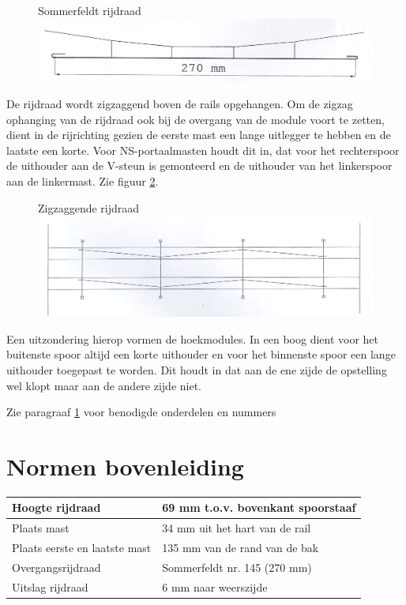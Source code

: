 \documentclass[12pt,a4paper]{report}
\begin{document}
\begin{figure}[ht]
  \captionbox
  {Sommerfeldt rijdraad\label{figuur9}}
  {\includegraphics[scale=1.0]{images/rcu_figuur9}}
\end{figure}

De rijdraad wordt zigzaggend boven de rails opgehangen. Om de zigzag ophanging van de rijdraad ook bij de overgang van de module voort te zetten, dient in de rijrichting gezien de eerste mast een lange uitlegger te hebben en de laatste een korte. Voor NS-portaalmasten houdt dit in, dat voor het rechterspoor de uithouder aan de V-steun is gemonteerd en de uithouder van het linkerspoor aan de linkermast. Zie figuur \ref{figuur10}.

\begin{figure}[ht]
  \captionbox
  {Zigzaggende rijdraad\label{figuur10}}
  {\includegraphics[scale=1.0]{images/rcu_figuur10}}
\end{figure}

Een uitzondering hierop vormen de hoekmodules. In een boog dient voor het buitenste spoor altijd een korte uithouder en voor het binnenste spoor een lange uithouder toegepast te worden. Dit houdt in dat aan de ene zijde de opstelling wel klopt maar aan de andere zijde niet.

Zie paragraaf \ref{ch:normen_bovenleiding} voor benodigde onderdelen en nummers

\section{Normen bovenleiding}
\label{ch:normen_bovenleiding}

\begin{tabular}{| l | l |}
\hline
\cellcolor[gray]{0.84}Hoogte rijdraad&69 mm t.o.v. bovenkant spoorstaaf\\
\hline
\cellcolor[gray]{0.84}Plaats mast&34 mm uit het hart van de rail\\
\hline
\cellcolor[gray]{0.84}Plaats eerste en laatste mast&135 mm van de rand van de bak\\
\hline
\cellcolor[gray]{0.84}Overgangsrijdraad&Sommerfeldt nr. 145 (270 mm)\\
\hline
\cellcolor[gray]{0.84}Uitslag rijdraad&6 mm naar weerszijde\\
\hline
\end{tabular}
\\
\end{document}
